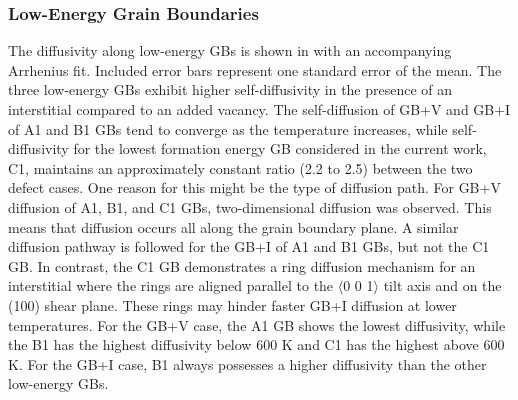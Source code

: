 \documentclass[review]{elsarticle}
\begin{document}
\subsubsection{Low-Energy Grain Boundaries}

\par The diffusivity along low-energy GBs is shown in  with an accompanying Arrhenius fit. Included error bars represent one standard error of the mean. The three low-energy GBs exhibit higher self-diffusivity in the presence of an interstitial compared to an added vacancy. The self-diffusion of GB+V and GB+I of A1 and B1 GBs tend to converge as the temperature increases, while self-diffusivity for the lowest formation energy GB considered in the current work, C1, maintains an approximately constant ratio (2.2 to 2.5) between the two defect cases. One reason for this might be the type of diffusion path. For GB+V diffusion of A1, B1, and C1 GBs, two-dimensional diffusion was observed. This means that diffusion occurs all along the grain boundary plane. A similar diffusion pathway is followed for the GB+I of A1 and B1 GBs, but not the C1 GB. In contrast, the C1 GB demonstrates a ring diffusion mechanism for an interstitial where the rings are aligned parallel to the $\langle$0 0 1$\rangle$ tilt axis and on the (100) shear plane. These rings may hinder faster GB+I diffusion at lower temperatures. For the GB+V case, the A1 GB shows the lowest diffusivity, while the B1 has the highest diffusivity below 600 K and C1 has the highest above 600 K. For the GB+I case, B1 always possesses a higher diffusivity than the other low-energy GBs. 
\end{document}
